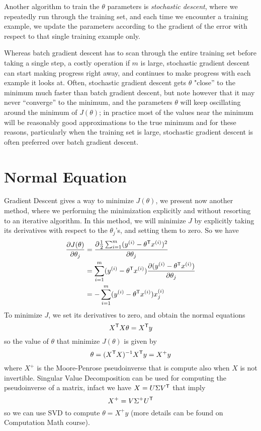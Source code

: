 Another algorithm to train the $\theta$ parameters is \emph{stochastic descent}, where 
we repeatedly run through the training set, and each time we encounter a training example,
we update the parameters according to the gradient of the error with respect to that single training example only.

Whereas batch gradient descent has to scan through the entire training set before taking a single step,
a costly operation if $m$ is large, stochastic gradient descent can start making progress right away,
and continues to make progress with each example it looks at.\newline
Often, stochastic gradient descent gets $\theta$ "close” to the minimum much faster than batch 
gradient descent, but note however that it may never “converge” to the minimum, and the parameters
$\theta$ will keep oscillating around the minimum of $J(\theta)$; in practice most of the values near the minimum
will be reasonably good approximations to the true minimum and for these reasons, particularly when 
the training set is large, stochastic gradient descent is often preferred over batch gradient descent.

\section{Normal Equation}
Gradient Descent gives a way to minimize $J(\theta)$, we present now another method, where 
we performing the minimization explicitly and without resorting to an iterative algorithm.\newline
In this method, we will minimize $J$ by explicitly taking its derivatives with respect to the $\theta_j$’s,
and setting them to zero.\newline
So we have
\begin{align*}
	\frac{\partial J(\theta)}{\partial \theta_j} & = \frac{\partial \frac{1}{2} \sum_{i=1}^m (y^{(i)}-\theta ^ \mathsf{T}x^{(i)})^2}{\partial \theta_j} \\
	                                 & = \sum _{i=1}^m (y^{(i)} - \theta ^ \mathsf{T}x^{(i)}) \frac{\partial (y^{(i)} - \theta ^ \mathsf{T}x^{(i)})}{\partial \theta_j} \\
					 & = - \sum _{i=1}^m (y^{(i)} - \theta ^ \mathsf{T}x^{(i)}) x^{(i)}_j \\
\end{align*}
To minimize $J$, we set its derivatives to zero, and obtain the normal equations
\[ X ^ \mathsf{T} X \theta = X ^ \mathsf{T} y \]
so the value of $\theta$ that minimize $J(\theta)$ is given by 
\[ \theta = (X ^ \mathsf{T} X)^{-1} X ^ \mathsf{T} y = X^+ y\]
where $X^+$ is the Moore-Penrose pseudoinverse that is compute also when $X$ is not invertible.\newline
Singular Value Decomposition can be used for computing the pseudoinverse of a matrix, infact we have $X = U \Sigma V ^ \mathsf{T}$ that imply 
\[ X^+ = V \Sigma^+ U ^ \mathsf{T} \]
so we can use SVD to compute $\theta = X^+ y$ (more details can be found on Computation Math course).

